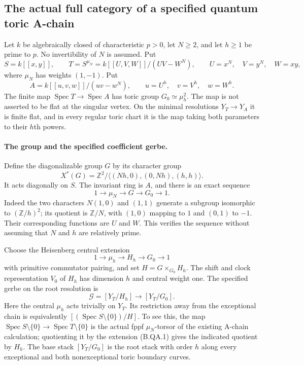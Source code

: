 \subsection*{The actual full category of a specified quantum toric A-chain}

Let $k$ be algebraically closed of characteristic $p>0$, let $N\ge2$, and
let $h\ge1$ be prime to $p$.  No invertibility of $N$ is assumed.  Put
\[
 S=k[[x,y]],\qquad
 T=S^{\mu_N}=k[[U,V,W]]/(UV-W^N),\qquad
 U=x^N,\quad V=y^N,\quad W=xy,
\]
where $\mu_N$ has weights $(1,-1)$.  Put
\[
 A=k[[u,v,w]]/(uv-w^N),\qquad
 u=U^h,\quad v=V^h,\quad w=W^h.
\]
The finite map $\operatorname{Spec}T\to\operatorname{Spec}A$ has toric
group $G_0\simeq\mu_h^2$.  The map is not asserted to be flat at the
singular vertex.  On the minimal resolutions $Y_T\to Y_A$ it is finite
flat, and in every regular toric chart it is the map taking both
parameters to their $h$th powers.

\paragraph{The group and the specified coefficient gerbe.}
Define the diagonalizable group $G$ by its character group
\[
 X^*(G)=\mathbb Z^2/
          \langle(Nh,0),(0,Nh),(h,h)\rangle.
\]
It acts diagonally on $S$.  The invariant ring is $A$, and there is an
exact sequence
\[
             1\longrightarrow\mu_N\longrightarrow G
                         \longrightarrow G_0\longrightarrow1. \tag{B.QA.1}
\]
Indeed the two characters $N(1,0)$ and $(1,1)$ generate a subgroup
isomorphic to $(\mathbb Z/h)^2$; its quotient is $\mathbb Z/N$, with
$(1,0)$ mapping to $1$ and $(0,1)$ to $-1$.  Their corresponding
functions are $U$ and $W$.  This verifies the sequence without assuming
that $N$ and $h$ are relatively prime.

Choose the Heisenberg central extension
\[
 1\longrightarrow\mu_h\longrightarrow H_h
                  \longrightarrow G_0\longrightarrow1
\]
with primitive commutator pairing, and set
$H=G\times_{G_0}H_h$.  The shift and clock representation $V_0$ of
$H_h$ has dimension $h$ and central weight one.  The specified gerbe
on the root resolution is
\[
                  \mathcal G=[Y_T/H_h]\longrightarrow[Y_T/G_0].
                                                               \tag{B.QA.2}
\]
Here the central $\mu_h$ acts trivially on $Y_T$.  Its restriction away
from the exceptional chain is equivalently
$[(\operatorname{Spec}S\setminus\{0\})/H]$.
To see this, the map
$\operatorname{Spec}S\setminus\{0\}\to
 \operatorname{Spec}T\setminus\{0\}$
is the actual fppf $\mu_N$-torsor of the existing A-chain calculation;
quotienting it by the extension (B.QA.1) gives the indicated quotient
by $H_h$.  The base stack $[Y_T/G_0]$ is the root stack with order $h$
along every exceptional and both nonexceptional toric boundary curves.

